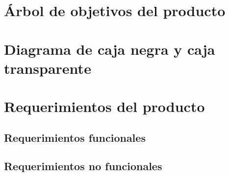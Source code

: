 \section{Árbol de objetivos del producto}
\label{sec:arbol_objetivos}



\section{Diagrama de caja negra y caja transparente}
\label{sec:caja_negra}



\section{Requerimientos del producto}
\label{sec:requerimientos}

\subsection{Requerimientos funcionales}
\label{subsec:rf}


\subsection{Requerimientos no funcionales}
\label{subsec:rnf}


\clearpage
\flushbottom
